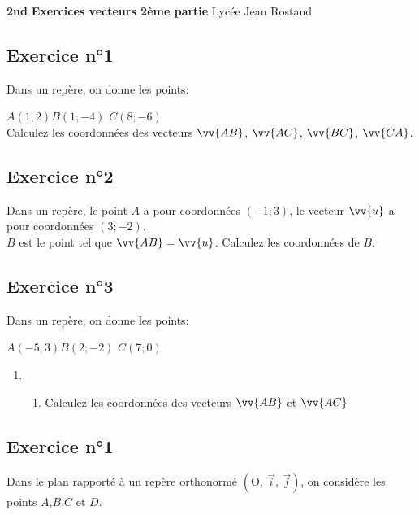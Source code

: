 \documentclass[12pt,a4paper]{article}
\def\Oij{$\left(\text{O},~\vec{i},~\vec{j}\right)$}
\begin{document}
\textbf{2nd} \hfill \textbf{Exercices vecteurs 2ème partie} \hfill Lycée Jean Rostand\\
\trait 

\subsection*{Exercice n°1}

Dans un repère, on donne les points:

$A(1;2)$\qquad $B(1;-4)$ \qquad $C(8;-6)$\\
Calculez les coordonnées des vecteurs $\vv{AB}$, $\vv{AC}$, $\vv{BC}$, $\vv{CA}$.

\subsection*{Exercice n°2}

Dans un repère, le point $A$ a pour coordonnées $(-1;3)$, le vecteur $\vv{u}$ a pour coordonnées $(3;-2)$.\\
$B$ est le point tel que $\vv{AB}=\vv{u}$.
Calculez les coordonnées de $B$.

\subsection*{Exercice n°3}

Dans un repère, on donne les points:

$A(-5;3)$\qquad $B(2;-2)$ \qquad $C(7;0)$\\

\begin{enumerate}
    \item 
    \begin{enumerate}
        \item Calculez les coordonnées des vecteurs $\vv{AB}$ et $\vv{AC}$
        
    \end{enumerate}
\end{enumerate}




\subsection*{Exercice n°1}

Dans le plan rapporté à un repère orthonormé \Oij{}, on considère les points $A$,$B$,$C$ et $D$.

\begin{center}
\end{center}
\end{document}
